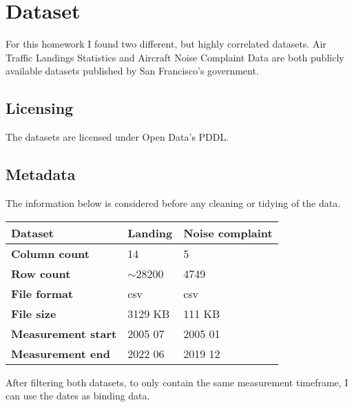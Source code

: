 \documentclass[a4paper,11pt]{article}
\begin{document}
    \newcommand{\hwtitle}{Homework specification \\ Air traffic and noise complaints in San Francisco}
    

    \section{Dataset}
    For this homework I found two different, but highly correlated datasets.
    Air Traffic Landings Statistics\cite{datasource:landing} and Aircraft Noise Complaint Data\cite{datasource:noise}
    are both publicly available datasets published by San Francisco's government.
    \subsection{Licensing}
    The datasets are licensed under Open Data's PDDL\cite{license:pddl}.
    \subsection{Metadata}
    The information below is considered before any cleaning or tidying of the data.

    \begin{table}[ht]
        \centering
        \begin{tabular}{|l|l|l|}
        \hline
        \textbf{Dataset}           & \textbf{Landing} & \textbf{Noise complaint} \\ \hline
        \textbf{Column count}      & 14               & 5                        \\ \hline
        \textbf{Row count}         & $\sim$28200      & 4749                     \\ \hline
        \textbf{File format}       & csv              & csv                      \\ \hline
        \textbf{File size}         & 3129 KB          & 111 KB                   \\ \hline
        \textbf{Measurement start} & 2005 07          & 2005 01                  \\ \hline
        \textbf{Measurement end}   & 2022 06          & 2019 12                  \\ \hline
        \end{tabular}
    \end{table}

    After filtering both datasets, to only contain the same measurement timeframe,
    I can use the dates as binding data. 
\end{document}
